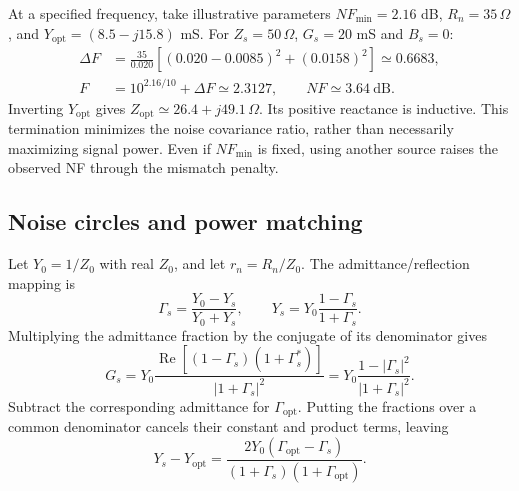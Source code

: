 \begin{example}[title={Source dependence of noise figure}]
At a specified frequency, take illustrative parameters $NF_{\min}=2.16$ dB, $R_n=35\,\Omega$, and $Y_{\mathrm{opt}}=(8.5-j15.8)$ mS. For $Z_s=50\,\Omega$, $G_s=20$ mS and $B_s=0$:
\begin{align*}
\Delta F&=\frac{35}{0.020}[(0.020-0.0085)^2+(0.0158)^2]\simeq0.6683,\\
F&=10^{2.16/10}+\Delta F\simeq2.3127,\qquad NF\simeq3.64\ \mathrm{dB}.
\end{align*}
Inverting $Y_{\mathrm{opt}}$ gives $Z_{\mathrm{opt}}\simeq26.4+j49.1\,\Omega$. Its positive reactance is inductive. This termination minimizes the noise covariance ratio, rather than necessarily maximizing signal power. Even if $NF_{\min}$ is fixed, using another source raises the observed NF through the mismatch penalty.
\end{example}

\subsection{Noise circles and power matching}
Let $Y_0=1/Z_0$ with real $Z_0$, and let $r_n=R_n/Z_0$. The admittance/reflection mapping is
\[
\Gamma_s=\frac{Y_0-Y_s}{Y_0+Y_s},\qquad
Y_s=Y_0\frac{1-\Gamma_s}{1+\Gamma_s}.
\]
Multiplying the admittance fraction by the conjugate of its denominator gives
\[
G_s=Y_0\frac{\operatorname{Re}[(1-\Gamma_s)(1+\Gamma_s^*)]}{|1+\Gamma_s|^2}
=Y_0\frac{1-|\Gamma_s|^2}{|1+\Gamma_s|^2}.
\]
Subtract the corresponding admittance for $\Gamma_{\mathrm{opt}}$. Putting the fractions over a common denominator cancels their constant and product terms, leaving
\[
Y_s-Y_{\mathrm{opt}}
=\frac{2Y_0(\Gamma_{\mathrm{opt}}-\Gamma_s)}{(1+\Gamma_s)(1+\Gamma_{\mathrm{opt}})}.
\]

